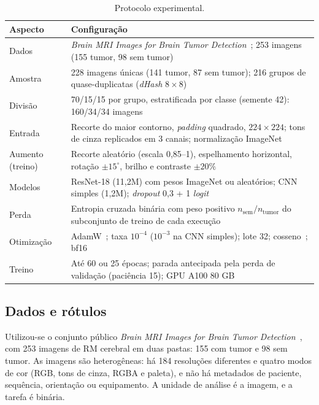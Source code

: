 \documentclass[conference]{IEEEtran}
\begin{document}
\begin{table}[t]
\centering
\caption{Protocolo experimental.}
\label{tab:protocolo}
\footnotesize
\renewcommand{\arraystretch}{1.05}
\begin{tabular}{@{}p{1.5cm}p{6.25cm}@{}}
\toprule
Aspecto & Configuração \\
\midrule
Dados & \textit{Brain MRI Images for Brain Tumor Detection}~\cite{kaggle2019brain}; 253 imagens (155 tumor, 98 sem tumor) \\
Amostra & 228 imagens únicas (141 tumor, 87 sem tumor); 216 grupos de quase-duplicatas (\textit{dHash} $8\times8$) \\
Divisão & 70/15/15 por grupo, estratificada por classe (semente 42): 160/34/34 imagens \\
Entrada & Recorte do maior contorno, \textit{padding} quadrado, $224\times224$; tons de cinza replicados em 3 canais; normalização ImageNet \\
Aumento (treino) & Recorte aleatório (escala 0,85--1), espelhamento horizontal, rotação $\pm15^\circ$, brilho e contraste $\pm20\%$ \\
Modelos & ResNet-18 (11,2M) com pesos ImageNet ou aleatórios; CNN simples (1,2M); \textit{dropout} 0,3 + 1 \textit{logit} \\
Perda & Entropia cruzada binária com peso positivo $n_{\text{sem}}/n_{\text{tumor}}$ do subconjunto de treino de cada execução \\
Otimização & AdamW~\cite{loshchilov2019adamw}; taxa $10^{-4}$ ($10^{-3}$ na CNN simples); lote 32; cosseno~\cite{loshchilov2017sgdr}; bf16 \\
Treino & Até 60 ou 25 épocas; parada antecipada pela perda de validação (paciência 15); GPU A100 80 GB \\
\bottomrule
\end{tabular}
\end{table}

\subsection{Dados e rótulos}

Utilizou-se o conjunto público \textit{Brain MRI Images for Brain Tumor Detection}~\cite{kaggle2019brain}, com 253 imagens de RM cerebral em duas pastas: 155 com tumor e 98 sem tumor. As imagens são heterogêneas: há 184 resoluções diferentes e quatro modos de cor (RGB, tons de cinza, RGBA e paleta), e não há metadados de paciente, sequência, orientação ou equipamento. A unidade de análise é a imagem, e a tarefa é binária.
\end{document}
